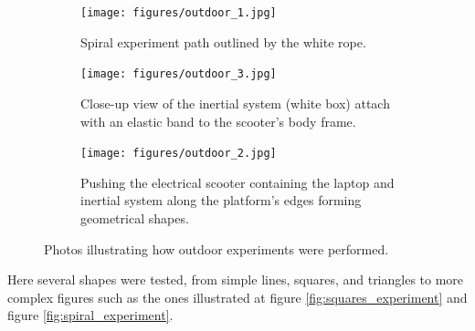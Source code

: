 \begin{figure}[!h]
    \centering
    \begin{subfigure}{0.8\textwidth}
        \centering
        \texttt{[image: figures/outdoor\_1.jpg]}
        \caption{ Spiral experiment path outlined by the white rope. }
        \label{fig:outdoor_1}
    \end{subfigure}

    \begin{subfigure}{0.40\textwidth}
        \centering
        \texttt{[image: figures/outdoor\_3.jpg]}
        \caption{ Close-up view of the inertial system (white box) attach with an elastic band to the scooter's body frame. }
        \label{fig:outdoor_2}
    \end{subfigure}
    \begin{subfigure}{0.40\textwidth}
        \centering
        \texttt{[image: figures/outdoor\_2.jpg]}
        \caption{ Pushing the electrical scooter containing the laptop and inertial system along the platform's edges forming geometrical shapes. }
        \label{fig:outdoor_3}
    \end{subfigure}
    \caption{ Photos illustrating how outdoor experiments were performed.}
    \label{fig:outdoor_experiments}
\end{figure}

Here several shapes were tested, from simple lines, squares, and triangles to more complex figures such as the ones illustrated at figure \ref{fig:squares_experiment} and figure \ref{fig:spiral_experiment}.

